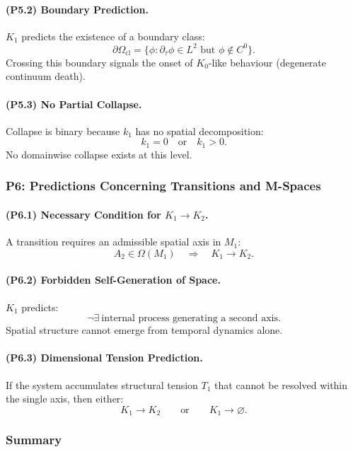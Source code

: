 \paragraph{(P5.2) Boundary Prediction.}
$K_1$ predicts the existence of a boundary class:
\[
\partial\Omega_{\mathrm{cl}} = 
\{ \phi : \partial_\tau \phi \in L^2 \text{ but } \phi \notin C^0 \}.
\]
Crossing this boundary signals the onset of $K_0$-like behaviour (degenerate
continuum death).

\paragraph{(P5.3) No Partial Collapse.}
Collapse is binary because $k_1$ has no spatial decomposition:
\[
k_1 = 0\quad \text{or}\quad k_1 > 0.
\]
No domainwise collapse exists at this level.

\subsubsection{P6: Predictions Concerning Transitions and M-Spaces}

\paragraph{(P6.1) Necessary Condition for \texorpdfstring{$K_1 \to K_2$}{K_1 \to K_2}.}
A transition requires an admissible spatial axis in $M_1$:
\[
A_2 \in \Omega(M_1)
\quad\Rightarrow\quad K_1\to K_2.
\]

\paragraph{(P6.2) Forbidden Self-Generation of Space.}
$K_1$ predicts:
\[
\neg\exists\ \text{internal process generating a second axis}.
\]
Spatial structure cannot emerge from temporal dynamics alone.

\paragraph{(P6.3) Dimensional Tension Prediction.}
If the system accumulates structural tension $T_1$ that cannot be resolved
within the single axis, then either:
\[
K_1 \rightarrow K_2
\qquad\text{or}\qquad
K_1 \rightarrow \varnothing.
\]

\subsubsection{Summary}

